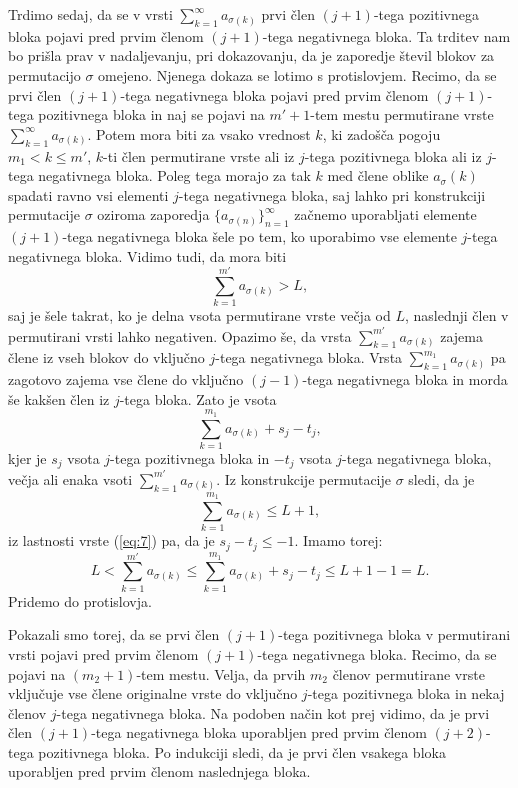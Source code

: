 \documentclass[12pt,a4paper,reqno]{amsart}
\theoremstyle{definition} %
\theoremstyle{plain} %
\begin{document}
Trdimo sedaj, da se v vrsti $\sum_{k=1}^{\infty}a_{\sigma(k)}$ prvi člen $(j+1)$-tega pozitivnega bloka pojavi pred prvim členom $(j+1)$-tega negativnega bloka. Ta trditev nam bo prišla prav v nadaljevanju, pri dokazovanju, da je zaporedje števil blokov za permutacijo $\sigma$ omejeno. Njenega dokaza se lotimo s protislovjem. Recimo, da se prvi člen $(j+1)$-tega negativnega bloka pojavi pred prvim členom $(j+1)$-tega pozitivnega bloka in naj se pojavi na $m'+1$-tem mestu permutirane vrste $\sum_{k=1}^{\infty}a_{\sigma(k)}$. Potem mora biti za vsako vrednost $k$, ki zadošča pogoju $m_1<k\leq m'$, $k$-ti člen permutirane vrste ali iz $j$-tega pozitivnega bloka ali iz $j$-tega negativnega bloka. Poleg tega morajo za tak $k$ med člene oblike $a_\sigma(k)$ spadati ravno vsi elementi $j$-tega negativnega bloka, saj lahko pri konstrukciji permutacije $\sigma$ oziroma zaporedja $\{a_{\sigma(n)}\}_{n=1}^{\infty}$ začnemo uporabljati elemente $(j+1)$-tega negativnega bloka šele po tem, ko uporabimo vse elemente $j$-tega negativnega bloka. Vidimo tudi, da mora biti $$\sum_{k=1}^{m'}a_{\sigma(k)}>L,$$saj je šele takrat, ko je delna vsota permutirane vrste večja od $L$, naslednji člen v permutirani vrsti lahko negativen.
Opazimo še, da vrsta $\sum_{k=1}^{m'}a_{\sigma(k)}$ zajema člene iz vseh blokov do vključno $j$-tega negativnega bloka. %
Vrsta $\sum_{k=1}^{m_1}a_{\sigma(k)}$ pa zagotovo zajema vse člene do vključno $(j-1)$-tega negativnega bloka in morda še kakšen člen iz $j$-tega bloka. Zato je vsota $$\sum_{k=1}^{m_1}a_{\sigma(k)}+s_j-t_j,$$kjer je $s_j$ vsota $j$-tega pozitivnega bloka in $-t_j$ vsota $j$-tega negativnega bloka, večja ali enaka vsoti $\sum_{k=1}^{m'}a_{\sigma(k)}$. Iz konstrukcije permutacije $\sigma$ sledi, da je $$\sum_{k=1}^{m_1}a_{\sigma(k)}\leq L+1,$$ iz lastnosti vrste (\ref{eq:7}) pa, da je $s_j-t_j \leq -1$. Imamo torej: $$L< \sum_{k=1}^{m'}a_{\sigma(k)}\leq  \sum_{k=1}^{m_1}a_{\sigma(k)}+s_j-t_j \leq L+1-1=L.$$
Pridemo do protislovja.

Pokazali smo torej, da se prvi člen $(j+1)$-tega pozitivnega bloka v permutirani vrsti pojavi pred prvim členom $(j+1)$-tega negativnega bloka. Recimo, da se pojavi na $(m_2+1)$-tem mestu. Velja, da prvih $m_2$ členov permutirane vrste vključuje vse člene originalne vrste do vključno $j$-tega pozitivnega bloka in nekaj členov $j$-tega negativnega bloka. %
Na podoben način kot prej vidimo, da je prvi člen $(j+1)$-tega negativnega bloka uporabljen pred prvim členom $(j+2)$-tega pozitivnega bloka. %
Po indukciji sledi, da je prvi člen vsakega bloka uporabljen pred prvim členom naslednjega bloka.
\end{document}
